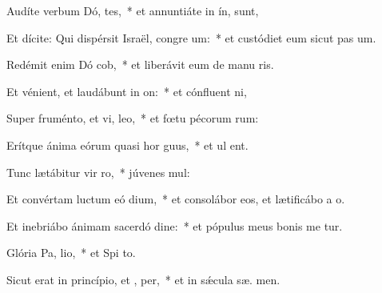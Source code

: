 \item Audíte verbum Dó, tes,~* et annuntiáte in ín,   sunt,
\item Et dícite: Qui dispérsit Israël, congre um:~* et custódiet eum sicut pas  um.
\item Redémit enim Dó cob,~* et liberávit eum de manu ris.
\item Et vénient, et laudábunt in  on:~* et cónfluent   ni,
\item Super fruménto, et vi,  leo,~* et fœtu pécorum  rum:
\item Erítque ánima eórum quasi hor guus,~* et ul  ent.
\item Tunc lætábitur vir  ro,~* júvenes   mul:
\item Et convértam luctum eó  dium,~* et consolábor eos, et lætificábo a  o.
\item Et inebriábo ánimam sacerdó dine:~* et pópulus meus bonis me tur.
\item Glória Pa,  lio,~* et Spi to.
\item Sicut erat in princípio, et ,  per,~* et in sǽcula sæ. men.

